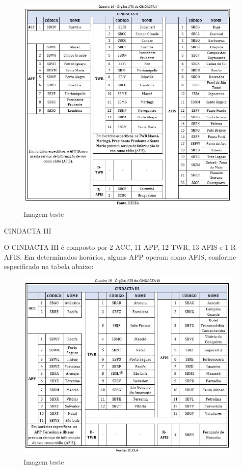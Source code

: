 \documentclass[
]{book}
\begin{document}
\begin{figure}
\centering
\includegraphics{imagens/fig92.jpg}
\caption{Imagem teste}
\end{figure}

CINDACTA III

O CINDACTA III é composto por 2 ACC, 11 APP, 12 TWR, 13 AFIS e 1 R-AFIS. Em determinados horários, alguns APP operam como AFIS, conforme especificado na tabela abaixo:

\begin{figure}
\centering
\includegraphics{imagens/fig93.jpg}
\caption{Imagem teste}
\end{figure}
\end{document}
